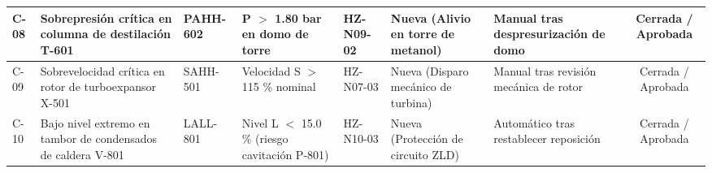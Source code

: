 \documentclass[10pt,letterpaper]{article}
\begin{document}
\begin{table}[H]
\begin{tabularx}{\textwidth}{|l|X|p{2.2cm}|p{2.6cm}|l|p{2.4cm}|p{2.2cm}|c|}
C-08 & Sobrepresión crítica en columna de destilación T-601 & PAHH-602 & P $>$ 1.80 bar en domo de torre & HZ-N09-02 & Nueva (Alivio en torre de metanol) & Manual tras despresurización de domo & Cerrada / Aprobada \\ \hline
C-09 & Sobrevelocidad crítica en rotor de turboexpansor X-501 & SAHH-501 & Velocidad S $>$ 115 \% nominal & HZ-N07-03 & Nueva (Disparo mecánico de turbina) & Manual tras revisión mecánica de rotor & Cerrada / Aprobada \\ \hline
C-10 & Bajo nivel extremo en tambor de condensados de caldera V-801 & LALL-801 & Nivel L $<$ 15.0 \% (riesgo cavitación P-801) & HZ-N10-03 & Nueva (Protección de circuito ZLD) & Automático tras restablecer reposición & Cerrada / Aprobada \\ \hline
\end{tabularx}
\end{table}
\end{document}
